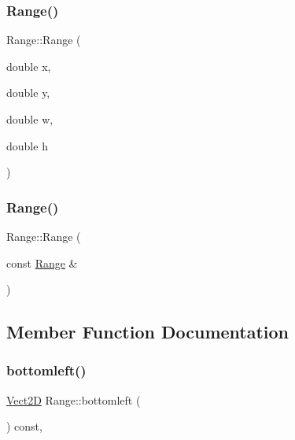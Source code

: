 \mbox{\label{classRange_a3755a3d0c163bba29d5c7469e15765a0_a3755a3d0c163bba29d5c7469e15765a0}} 
\subsubsection{\texorpdfstring{Range()}{Range()}\hspace{0.1cm}{\footnotesize\ttfamily [2/3]}}
{\footnotesize\ttfamily Range\+::\+Range (\begin{DoxyParamCaption}\item[{double}]{x,  }\item[{double}]{y,  }\item[{double}]{w,  }\item[{double}]{h }\end{DoxyParamCaption})\hspace{0.3cm}{\ttfamily [inline]}}

\mbox{\label{classRange_a917b57d9db8d4176bd8963c8cc620d1b_a917b57d9db8d4176bd8963c8cc620d1b}} 
\subsubsection{\texorpdfstring{Range()}{Range()}\hspace{0.1cm}{\footnotesize\ttfamily [3/3]}}
{\footnotesize\ttfamily Range\+::\+Range (\begin{DoxyParamCaption}\item[{const \hyperlink{classRange}{Range} \&}]{ }\end{DoxyParamCaption})\hspace{0.3cm}{\ttfamily [default]}}



\subsection{Member Function Documentation}
\mbox{\label{classRange_a60dee0a1d68dd669b2e760d29c7641e7_a60dee0a1d68dd669b2e760d29c7641e7}} 
\subsubsection{\texorpdfstring{bottomleft()}{bottomleft()}}
{\footnotesize\ttfamily \hyperlink{classVect2D}{Vect2D} Range\+::bottomleft (\begin{DoxyParamCaption}{ }\end{DoxyParamCaption}) const\hspace{0.3cm}{\ttfamily [inline]}, {\ttfamily [private]}}


